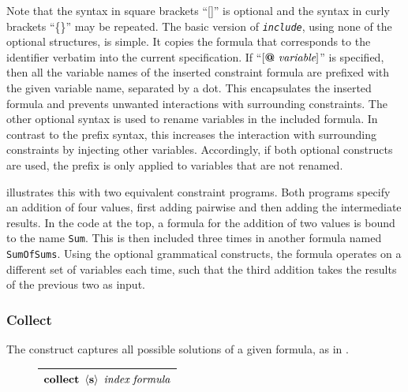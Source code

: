     \noindent
    Note that the syntax in square brackets ``[]'' is optional and the syntax in
    curly brackets ``\{\}'' may be repeated.
    The basic version of \texttt{\it include}, using none of the optional
    structures, is simple.
    It copies the formula that corresponds to the identifier verbatim into
    the current specification.
    If ``$[\text{\bf @}\ \text{\it variable}]$'' is specified, then all the
    variable names of the inserted constraint formula are prefixed with the
    given variable name, separated by a dot.
    This encapsulates the inserted formula and prevents unwanted
    interactions with surrounding constraints.
    The other optional syntax is used to rename variables in the included
    formula.
    In contrast to the prefix syntax, this increases the interaction with
    surrounding constraints by injecting other variables.
    Accordingly, if both optional constructs are used, the prefix is only
    applied to variables that are not renamed.

     illustrates this with two
    equivalent constraint programs.
    Both programs specify an addition of four values, first adding pairwise and
    then adding the intermediate results.
    In the code at the top, a formula for the addition of two values is
    bound to the name {\tt Sum}.
    This is then included three times in another formula named {\tt SumOfSums}.
    Using the optional grammatical constructs, the formula operates on a
    different set of variables each time, such that the third addition
    takes the results of the previous two as input.

\begin{figure}[h]

\end{figure}

\subsubsection{Collect}

    The  construct captures all possible solutions of a given
    formula, as in .
\begin{figure}[H]
    \centering
    \begin{tabular}{|c|}
        \hline
        $\text{\bf collect}\ \left<\text{\bf s}\right>\ \text{\it index}\ \text{\it formula}$\\
        \hline
    \end{tabular}
\end{figure}

